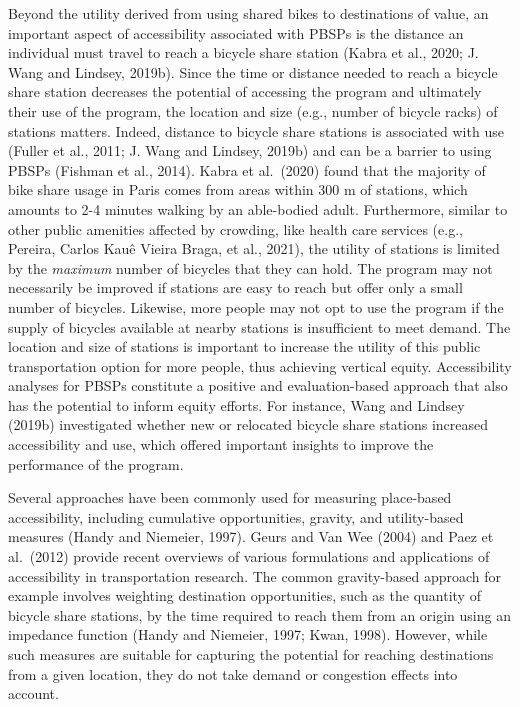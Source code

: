 \documentclass[]{elsarticle} %
\begin{document}
Beyond the utility derived from using shared bikes to destinations of
value, an important aspect of accessibility associated with PBSPs is the
distance an individual must travel to reach a bicycle share station
(Kabra et al., 2020; J. Wang and Lindsey, 2019b). Since the time or
distance needed to reach a bicycle share station decreases the potential
of accessing the program and ultimately their use of the program, the
location and size (e.g., number of bicycle racks) of stations matters.
Indeed, distance to bicycle share stations is associated with use
(Fuller et al., 2011; J. Wang and Lindsey, 2019b) and can be a barrier
to using PBSPs (Fishman et al., 2014). Kabra et al.~(2020) found that
the majority of bike share usage in Paris comes from areas within 300 m
of stations, which amounts to 2-4 minutes walking by an able-bodied
adult. Furthermore, similar to other public amenities affected by
crowding, like health care services (e.g., Pereira, Carlos Kauê Vieira
Braga, et al., 2021), the utility of stations is limited by the
\emph{maximum} number of bicycles that they can hold. The program may
not necessarily be improved if stations are easy to reach but offer only
a small number of bicycles. Likewise, more people may not opt to use the
program if the supply of bicycles available at nearby stations is
insufficient to meet demand. The location and size of stations is
important to increase the utility of this public transportation option
for more people, thus achieving vertical equity. Accessibility analyses
for PBSPs constitute a positive and evaluation-based approach that also
has the potential to inform equity efforts. For instance, Wang and
Lindsey (2019b) investigated whether new or relocated bicycle share
stations increased accessibility and use, which offered important
insights to improve the performance of the program.

Several approaches have been commonly used for measuring place-based
accessibility, including cumulative opportunities, gravity, and
utility-based measures (Handy and Niemeier, 1997). Geurs and Van Wee
(2004) and Paez et al.~(2012) provide recent overviews of various
formulations and applications of accessibility in transportation
research. The common gravity-based approach for example involves
weighting destination opportunities, such as the quantity of bicycle
share stations, by the time required to reach them from an origin using
an impedance function (Handy and Niemeier, 1997; Kwan, 1998). However,
while such measures are suitable for capturing the potential for
reaching destinations from a given location, they do not take demand or
congestion effects into account.
\end{document}

